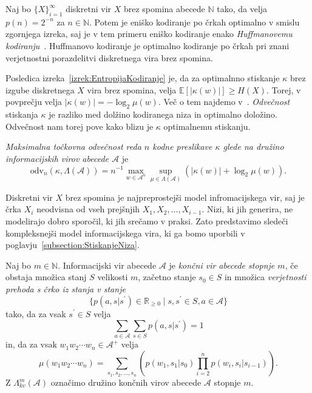\documentclass[fin1, tisk]{fmfdelo}
\providecommand{\abs}[1]{\left\lvert #1 \right\rvert}
\newcommand{\N}{\mathbb{N}}
\newcommand{\R}{\mathbb{R}}
\newcommand{\E}{\mathbb{E}}
\newcommand{\A}{\mathcal{A}}
\theoremstyle{definition}
\begin{document}
\begin{primer}
    Naj bo $\{ X \}_{i=1}^{\infty}$ diskretni vir $X$ brez spomina abecede $\N$ tako, da velja 
    $p(n) = 2^{-n}$ za $n \in \N$. Potem je eniško kodiranje po črkah optimalno v smislu zgornjega
    izreka, saj je v tem primeru eniško kodiranje enako \emph{Huffmanovemu kodiranju}~\cite{Huffman1952}.
    Huffmanovo kodiranje je optimalno kodiranje po črkah pri znani verjetnostni porazdelitvi 
    diskretnega vira brez spomina.
\end{primer}

Posledica izreka~\ref{izrek:EntropijaKodiranje} je, da za optimalnno stiskanje $\kappa$ brez 
izgube diskretnega $X$ vira brez spomina, velja $\E[\abs{\kappa(w)}] \geq H(X)$.
Torej, v povprečju velja $\abs{\kappa(w)} = - \log_2\mu(w)$. Več o tem najdemo 
v~\cite[1. poglavje, 5. razdelek]{Mackay2003}. \emph{Odvečnost} stiskanja $\kappa$
je razliko med dolžino kodiranega niza in optimalno doložino. Odvečnost nam torej pove kako
blizu je $\kappa$ optimalnemu stiskanju.

\begin{definicija}\label{def:odv}
    \emph{Maksimalna točkovna odvečnost reda $n$ kodne preslikave $\kappa$ glede na družino 
    informacijskih virov abecede $\A$} je
    \[
        \text{odv}_{n} \left( \kappa, \Lambda(\A) \right) = n^{-1} \max_{w \in \A^n} \sup_{\mu \in \Lambda(\A)}
        \left( \abs{\kappa(w)} + \log_2 \mu(w) \right).
    \]
\end{definicija}

Diskretni vir $X$ brez spomina je najpreprostejši model infromacijskega vir, saj je črka $X_i$ 
neodvisna od vseh prejšnjih $X_1, X_2, \ldots , X_{i-1}$. Nizi, ki jih generira, ne modelirajo
dobro sporočil, ki jih srečamo v praksi. Zato predstavimo sledeči kompleksnejši model
informacijskega vira, ki ga bomo uporbili v poglavju~\ref{subsection:StiskanjeNiza}.

\begin{definicija}\label{def:FSS} %
    Naj bo $m \in \N$. Informacijski vir abecede $\A$ je 
    \emph{končni vir abecede stopnje $m$}, če obstaja množica stanj $S$ velikosti $m$, 
    začetno stanje $s_0 \in S$ in množica \emph{verjetnosti prehoda s črko iz stanja v stanje}
    \[
        \{ p(a, s|s^\prime) \in \R_{\geq 0} \mid s, s^\prime \in S, a \in \A \}
    \] 
    tako, da za vsak $s^\prime \in S$ velja
    \[
        \sum_{a \in \A} \sum_{s \in S} p(a, s|s^\prime) = 1
    \]
    in, da za vsak $w_1w_2 \cdots w_n \in \A^+$ velja
    \[
        \mu(w_1w_2 \cdots w_n) = \sum_{s_1, s_2, \ldots, s_n} 
        \left( p(w_1,s_1|s_0) \prod_{i=2}^{n} p(w_i, s_i|s_{i-1}) \right).
    \]
    Z $\Lambda_{kv}^m(\A)$ označimo družino končnih virov abecede $\A$ stopnje $m$.
\end{definicija}
\end{document}
